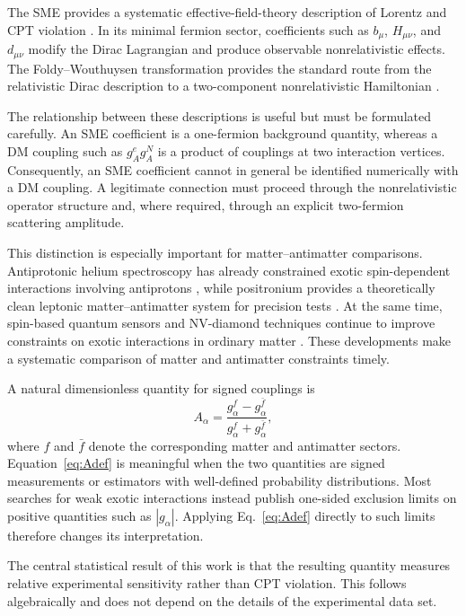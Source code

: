 \documentclass[aps,prd,reprint,superscriptaddress,nofootinbib]{revtex4-2}
\begin{document}
	The SME provides a systematic effective-field-theory description of
	Lorentz and CPT violation \cite{ColladayKostelecky1997,
		ColladayKostelecky1998}. In its minimal fermion sector, coefficients
	such as $b_\mu$, $H_{\mu\nu}$, and $d_{\mu\nu}$ modify the Dirac
	Lagrangian and produce observable nonrelativistic effects. The
	Foldy--Wouthuysen transformation provides the standard route from the
	relativistic Dirac description to a two-component nonrelativistic
	Hamiltonian \cite{FoldyWouthuysen1950,KosteleckyLane1999}.
	
	The relationship between these descriptions is useful but must be
	formulated carefully. An SME coefficient is a one-fermion background
	quantity, whereas a DM coupling such as $g_A^e g_A^N$ is a product of
	couplings at two interaction vertices. Consequently, an SME coefficient
	cannot in general be identified numerically with a DM coupling.
	A legitimate connection must proceed through the nonrelativistic
	operator structure and, where required, through an explicit
	two-fermion scattering amplitude.
	
	This distinction is especially important for matter--antimatter
	comparisons. Antiprotonic helium spectroscopy has already constrained
	exotic spin-dependent interactions involving antiprotons
	\cite{Ficek2018}, while positronium provides a theoretically clean
	leptonic matter--antimatter system for precision tests
	\cite{Adkins2022}. At the same time, spin-based quantum sensors and
	NV-diamond techniques continue to improve constraints on exotic
	interactions in ordinary matter \cite{Jiao2021,Liang2023,Jiang2024}.
	These developments make a systematic comparison of matter and
	antimatter constraints timely.
	
	A natural dimensionless quantity for signed couplings is
	\begin{equation}
		A_\alpha =
		\frac{g_\alpha^f-g_\alpha^{\bar f}}
		{g_\alpha^f+g_\alpha^{\bar f}},
		\label{eq:Adef}
	\end{equation}
	where $f$ and $\bar f$ denote the corresponding matter and antimatter
	sectors. Equation~\eqref{eq:Adef} is meaningful when the two quantities
	are signed measurements or estimators with well-defined probability
	distributions. Most searches for weak exotic interactions instead
	publish one-sided exclusion limits on positive quantities such as
	$|g_\alpha|$. Applying Eq.~\eqref{eq:Adef} directly to such limits
	therefore changes its interpretation.
	
	The central statistical result of this work is that the resulting
	quantity measures relative experimental sensitivity rather than
	CPT violation. This follows algebraically and does not depend on the
	details of the experimental data set.
	
\end{document}
